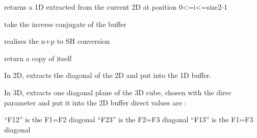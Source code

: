 \documentclass[letterpaper,10pt,openany,oneside]{sphinxmanual}
\begin{document}
\begin{fulllineitems}
\begin{fulllineitems}
\end{fulllineitems}


\begin{fulllineitems}
\label{rst/code:NPKData.NPKData.col}
returns a 1D extracted from the current 2D at position 0\textless{}=i\textless{}=size2-1

\end{fulllineitems}


\begin{fulllineitems}
\label{rst/code:NPKData.NPKData.conjg}
take the inverse conjugate of the buffer

\end{fulllineitems}


\begin{fulllineitems}
\label{rst/code:NPKData.NPKData.conv_n_p}
realises the n+p to SH conversion

\end{fulllineitems}


\begin{fulllineitems}
\label{rst/code:NPKData.NPKData.copy}
return a copy of itself

\end{fulllineitems}


\begin{fulllineitems}
\label{rst/code:NPKData.NPKData.diag}
In 2D, extracts the diagonal of the 2D and put into the 1D buffer.

In 3D, extracts one diagonal plane of the 3D cube, chosen with the direc parameter 
and put it into the 2D buffer
direct values are :

``F12'' is the F1=F2 diagonal
``F23'' is the F2=F3 diagonal
``F13'' is the F1=F3 diagonal

\end{fulllineitems}


\end{fulllineitems}
\end{document}
